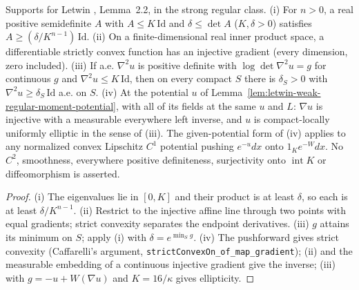 \begin{lemma}
  \label{lem:letwin-regular-moment-inverse-ellipticity}
  \leanok
  Supports for Letwin \cite{Letwin2026QuadraticKLS}, Lemma~2.2, in the strong regular class.
  (i) For $n>0$, a real positive semidefinite $A$ with $A\le K\,\mathrm{Id}$ and $\delta\le\det A$ ($K,\delta>0$) satisfies
  $A\ge(\delta/K^{n-1})\,\mathrm{Id}$.
  (ii) On a finite-dimensional real inner product space, a differentiable strictly convex function has an injective gradient (every
  dimension, zero included).
  (iii) If a.e. $\nabla^2u$ is positive definite with $\log\det\nabla^2u=g$ for continuous $g$ and $\nabla^2u\le K\,\mathrm{Id}$, then on every
  compact $S$ there is $\delta_S>0$ with $\nabla^2u\ge\delta_S\,\mathrm{Id}$ a.e. on $S$.
  (iv) At the potential $u$ of Lemma~\ref{lem:letwin-weak-regular-moment-potential}, with all of its fields at the same $u$ and $L$:
  $\nabla u$ is injective with a measurable everywhere left inverse, and $u$ is compact-locally uniformly elliptic in the sense of (iii).
  The given-potential form of (iv) applies to any normalized convex Lipschitz $C^1$ potential pushing $e^{-u}dx$ onto $1_Ke^{-W}dx$.
  No $C^2$, smoothness, everywhere positive definiteness, surjectivity onto $\operatorname{int}K$ or diffeomorphism is asserted.
\end{lemma}
\begin{proof}
  \leanok
  (i) The eigenvalues lie in $[0,K]$ and their product is at least $\delta$, so each is at least $\delta/K^{n-1}$. (ii) Restrict to the
  injective affine line through two points with equal gradients; strict convexity separates the endpoint derivatives. (iii) $g$ attains its
  minimum on $S$; apply (i) with $\delta=e^{\min_S g}$. (iv) The pushforward gives strict convexity
  (Caffarelli's argument, \texttt{strictConvexOn\_of\_map\_gradient}); (ii) and the measurable embedding of a continuous injective gradient give
  the inverse; (iii) with $g=-u+W(\nabla u)$ and $K=16/\kappa$ gives ellipticity.
\end{proof}

